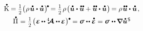 \vspace{.3em}
  

\nopagebreak\begin{equation*}
\begin{array}{c}
\mathdotabove{\kinetic} = \smalldisplaystyleonehalf \bigl( \hspace{.1ex} \rho \hspace{.2ex} \mathdotabove{\bm{u}} \dotp \mathdotabove{\bm{u}} \hspace{.1ex} \bigr)^{\hspace{-0.2ex}\tikz[baseline=-0.2ex] \draw[black, fill=black] (0,0) circle (.28ex);} \hspace{-0.2ex}
= \smalldisplaystyleonehalf \hspace{.2ex} \rho \hspace{.2ex} \bigl( \mathdotabove{\bm{u}} \dotp \mathdotdotabove{\bm{u}} + \mathdotdotabove{\bm{u}} \dotp \mathdotabove{\bm{u}} \hspace{.1ex} \bigr)
\hspace{-0.22ex} =
\rho \hspace{.2ex} \mathdotdotabove{\bm{u}} \dotp \mathdotabove{\bm{u}}
\hspace{.2ex} ,
\\[.5em]
%
\mathdotabove{\potential} \hspace{.1ex} = \hspace{.1ex} \smash{\smalldisplaystyleonehalf} \hspace{-0.25ex} \tikzmark{beginDerivativeOfElasticPotential} \left( \hspace{.1ex} \infinitesimaldeformation \hspace{-0.1ex} \dotdotp \hspace{-0.1ex} \stiffnesstensor \dotdotp \hspace{-0.1ex} \infinitesimaldeformation \hspace{.1ex} \right)^{\tikz[baseline=-0.2ex] \draw[black, fill=black] (0,0) circle (.28ex);} \hspace{-1.2ex} \tikzmark{endDerivativeOfElasticPotential} \hspace{.7ex}
= \linearstress \dotdotp \mathdotabove{\infinitesimaldeformation}
= \linearstress \hspace{.1ex} \dotdotp \hspace{-0.12ex} \boldnabla \mathdotabove{\bm{u}}^{\hspace{.1ex}\mathsf{S}} \hspace{-0.12ex}

\end{array}
\end{equation*}
